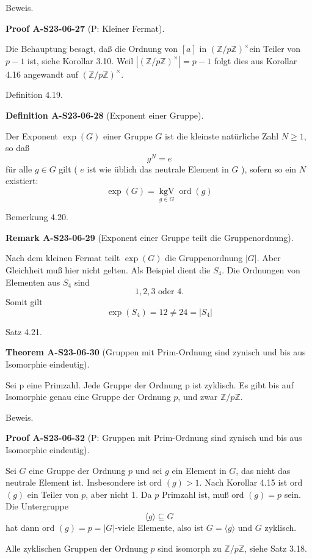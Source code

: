 \documentclass[10pt, letterpaper]{article}
\newcommand{\CustomHeading}[3]{%
  \par\medskip\noindent%
  \textbf{#1 #2} \textnormal{(#3)}.\enskip%
}
\newenvironment{DEF}[2]{\begin{unitbox}\CustomHeading{Definition}{#1}{#2}}{\end{unitbox}}
\newenvironment{THEO}[2]{\begin{unitbox}\CustomHeading{Theorem}{#1}{#2}}{\end{unitbox}}
\newenvironment{REM}[2]{\begin{unitbox}\CustomHeading{Remark}{#1}{#2}}{\end{unitbox}}
\newenvironment{PROOF}[2]{\begin{unitbox}\CustomHeading{Proof}{#1}{#2}}{\end{unitbox}}
\begin{document}
Beweis. 


\begin{PROOF}{A-S23-06-27}{P: Kleiner Fermat}
Die Behauptung besagt, daß die Ordnung von $[a]$ in $(\mathbb{Z} / p \mathbb{Z})^{\times}$ein Teiler von $p-1$ ist, siehe Korollar 3.10. Weil $\left|(\mathbb{Z} / p \mathbb{Z})^{\times}\right|=p-1$ folgt dies aus Korollar 4.16 angewandt auf $(\mathbb{Z} / p \mathbb{Z})^{\times}$.
\end{PROOF}


Definition 4.19. 


\begin{DEF}{A-S23-06-28}{Exponent einer Gruppe}
Der Exponent $\exp (G)$ einer Gruppe $G$ ist die kleinste natürliche Zahl $N \geq 1$, so daß
$$
g^{N}=e
$$
für alle $g \in G$ gilt ( $e$ ist wie üblich das neutrale Element in $G$ ), sofern so ein $N$ existiert:
$$
\exp (G)=\underset{g \in G}{\operatorname{kgV}} \operatorname{ord}(g)
$$
\end{DEF}


Bemerkung 4.20. 

\begin{REM}{A-S23-06-29}{Exponent einer Gruppe teilt die Gruppenordnung}
Nach dem kleinen Fermat teilt $\exp (G)$ die Gruppenordnung $|G|$. Aber Gleichheit muß hier nicht gelten. Als Beispiel dient die $S_{4}$. Die Ordnungen von Elementen aus $S_{4}$ sind
$$
1,2,3 \text { oder } 4 .
$$
Somit gilt
$$
\exp \left(S_{4}\right)=12 \neq 24=\left|S_{4}\right|
$$
\end{REM}

Satz 4.21. 


\begin{THEO}{A-S23-06-30}{Gruppen mit Prim-Ordnung sind zynisch und bis aus Isomorphie eindeutig}
Sei p eine Primzahl. Jede Gruppe der Ordnung p ist zyklisch. Es gibt bis auf Isomorphie genau eine Gruppe der Ordnung $p$, und zwar $\mathbb{Z} / p \mathbb{Z}$.
\end{THEO}

Beweis. 

\begin{PROOF}{A-S23-06-32}{P: Gruppen mit Prim-Ordnung sind zynisch und bis aus Isomorphie eindeutig}
Sei $G$ eine Gruppe der Ordnung $p$ und sei $g$ ein Element in $G$, das nicht das neutrale Element ist. Insbesondere ist ord $(g)>1$. Nach Korollar 4.15 ist ord $(g)$ ein Teiler von $p$, aber nicht 1. Da $p$ Primzahl ist, muß ord $(g)=p$ sein. Die Untergruppe
$$
\langle g\rangle \subseteq G
$$
hat dann ord $(g)=p=|G|$-viele Elemente, also ist $G=\langle g\rangle$ und $G$ zyklisch.

Alle zyklischen Gruppen der Ordnung $p$ sind isomorph zu $\mathbb{Z} / p \mathbb{Z}$, siehe Satz 3.18.
\end{PROOF}
\end{document}
